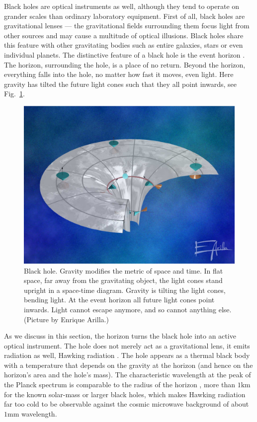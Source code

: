 \documentclass[12pt,amsmath,amssymb]{article}
\numberwithin{equation}{section}
\begin{document}
Black holes are optical instruments as well, although they tend to operate
on grander scales than ordinary laboratory equipment.
First of all, black holes are gravitational lenses \cite{Schneider} ---
the gravitational fields surrounding them focus light from other sources
and may cause a multitude of optical illusions.
Black holes share this feature with other gravitating bodies such as
entire galaxies, stars or even individual planets.
The distinctive feature of a black hole is the event horizon \cite{MTW}.
The horizon, surrounding the hole, is a place of no return.
Beyond the horizon, everything falls into the hole,
no matter how fast it moves, even light.
Here gravity has tilted the future light cones such that
they all point inwards, see Fig.\ \ref{fig:cc}.
\begin{figure}
\begin{center}
\includegraphics[width=12cm]{fig6.eps}
\end{center}
\caption{\label{fig:cc}Black hole. Gravity modifies the metric of
space and time. In flat space, far away from the gravitating
object, the light cones stand upright in a space-time diagram.
Gravity is tilting the light cones, bending light. At the event
horizon all future light cones point
inwards. Light cannot escape anymore, and so cannot anything else.
(Picture by Enrique Arilla.) }
\end{figure}

As we discuss in this section, the horizon turns the black hole into an
active optical instrument. The hole does not merely act as a
gravitational lens, it emits radiation as well, Hawking radiation
\cite{Birrell,Brout,Hawking1,Hawking2}.
The hole appears as a thermal black body with a temperature that
depends on the gravity at the horizon (and hence \cite{MTW}
on the horizon's area and the hole's mass).
The characteristic wavelength at the peak of the Planck spectrum is
comparable to the radius of the horizon \cite{Birrell,Brout},
more than $1\mbox{km}$
for the known solar-mass or larger black holes,
which makes Hawking radiation far too cold to be observable
against the cosmic microwave background
of about $1\mbox{mm}$ wavelength.
\end{document}
